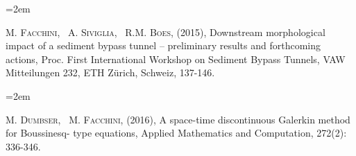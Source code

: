 \documentclass{scrartcl}
\newcommand{\MarginText}[1]{\marginpar{\raggedleft\itshape\small#1}} %
\newlength{\datebox}\settowidth{\datebox}{Spring 2011} %
\newcommand{\NewEntry}[3]{\noindent\hangindent=2em\hangafter=0 \parbox{\datebox}{\small \textit{#1}}\hspace{1.5em} #2 #3 %
\vspace{0.5em}} %
\newcommand{\Description}[1]{\hangindent=2em\hangafter=0\noindent\raggedright\footnotesize{#1}\par\normalsize\vspace{1em}} %
\begin{document}
\begin{cv}{}
%
%
%
%
%
%
%
%
%
%
%


\vspace{1em}

\Description{\MarginText{1}
	M. \textsc{Facchini}, ~A. \textsc{Siviglia}, ~R.M. \textsc{Boes}, (2015), Downstream morphological impact of a sediment bypass tunnel – preliminary results and forthcoming actions, Proc. First International Workshop on Sediment Bypass Tunnels, VAW Mitteilungen 232, ETH Z\"urich, Schweiz, 137-146.}


\Description{\MarginText{2}
	M. \textsc{Dumbser}, ~M. \textsc{Facchini}, (2016), A space-time discontinuous Galerkin method for Boussinesq- type equations, Applied Mathematics and Computation, 272(2): 336-346.}



\end{cv}
\end{document}
